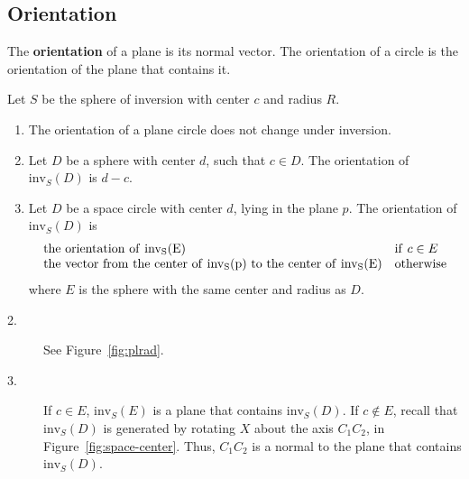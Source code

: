 
\subsection{Orientation}

\begin{defn2}
The {\bf orientation} of a plane is its normal vector.
The orientation of a circle is the orientation of the plane that contains it.
\end{defn2}

\begin{theorem}
\label{thm:orient}
Let $S$ be the sphere of inversion with center $c$ and radius $R$.
\begin{enumerate}

\item
The orientation of a plane circle does not change under inversion.

\item
Let $D$ be a sphere with center $d$, such that $c \in D$.
The orientation of $\mbox{inv}_{S}(D)$ is $d-c$.

\item
Let $D$ be a space circle with center $d$, 
lying in the plane $p$.
The orientation of $\mbox{inv}_{S}(D)$ is 
\[
\begin{array}{ll}
\rm{the\ orientation\ of\ } \mbox{inv}_{S}($E$)	&	{\rm if\ } c \in E \\
\rm{the\ vector\ from\ the\ center\ of\ } \mbox{inv}_{S}($p$)
\rm{\ to\ the\ center\ of\ } \mbox{inv}_{S}(E)
						&	{\rm otherwise}
\end{array}
\]
%
where $E$ is the sphere with the same center and radius as $D$.
\end{enumerate}
\end{theorem}
\ifFull
\else
\newpage
\fi
{}
\begin{description}
\item[2.]
See Figure~\ref{fig:plrad}. %
\item[3.]
If $c \in E$, $\mbox{inv}_{S}(E)$ is a plane that contains $\mbox{inv}_{S}(D)$.
If $c \not \in E$, 
recall that $\mbox{inv}_{S}(D)$ is generated by rotating $X$ about
the axis $C_{1}C_{2}$, in Figure~\ref{fig:space-center}.
Thus, $C_{1}C_{2}$ is a normal to the plane that contains $\mbox{inv}_{S}(D)$.
\end{description}
\QED

